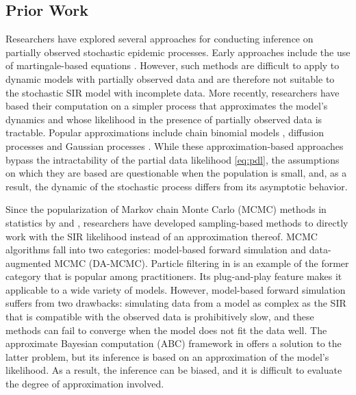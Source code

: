 \documentclass[12pt]{article}
\begin{document}
\subsection{Prior Work}
\label{sec:pre}
Researchers have explored several approaches for conducting inference on partially observed stochastic epidemic processes. Early approaches include the use of martingale-based equations \citep{Becker.1977, Watson.1981}. However, such methods are difficult to apply to dynamic models with partially observed data and are therefore not suitable to the stochastic SIR model with incomplete data.
More recently, researchers have based their computation on a simpler process that approximates the model's dynamics and whose likelihood in the presence of partially observed data is tractable. Popular approximations include chain binomial models \citep{Greenwood.1931, Abbey.1952}, diffusion processes \citep{Cauchemez.2008, Fintzi.2020} and Gaussian processes \citep{Jandarov.2014}. While these approximation-based approaches bypass the intractability of the partial data likelihood \eqref{eq:pdl}, the assumptions on which they are based are questionable when the population is small, and, as a result, the dynamic of the stochastic process differs from its asymptotic behavior.

Since the popularization of Markov chain Monte Carlo (MCMC) methods in statistics by \cite{Gelfand.1990} and \cite{Tierney.1994}, researchers have developed sampling-based methods to directly work with the SIR likelihood instead of an approximation thereof. MCMC algorithms fall into two categories: model-based forward simulation and data-augmented MCMC (DA-MCMC).
Particle filtering in \cite{King.2015} is an example of the former category that is popular among practitioners. Its plug-and-play feature makes it applicable to a wide variety of models. However, model-based forward simulation suffers from two drawbacks: simulating data from a model as complex as the SIR that is compatible with the observed data is prohibitively slow, and these methods can fail to converge when the model does not fit the data well. The approximate Bayesian computation (ABC) framework in \cite{McKinley.2018} offers a solution to the latter problem, but its inference is based on an approximation of the model's likelihood. As a result, the inference can be biased, and it is difficult to evaluate the degree of approximation involved. %
\end{document}
